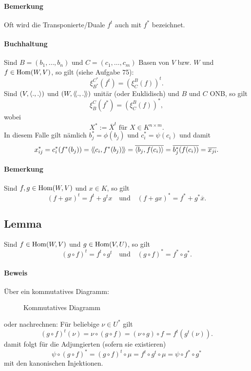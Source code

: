 \paragraph{Bemerkung}
	Oft wird die Transponierte/Duale $ f^t $ auch mit $ f^* $ bezeichnet.
\paragraph{Buchhaltung}
	Sind $ B=(b_1,\dots,b_n) $ und $ C=(c_1,\dots,c_m) $ Basen von $ V $ bzw. $ W $ und $ f\in \operatorname{Hom}(W,V) $, so gilt (siehe Aufgabe 75):
		\[ \xi_{B^*}^{C^*}(f^t) = \left(\xi_C^B(f)\right)^t. \]
	Sind $ (V,\langle .,. \rangle) $ und $ (W,\langle\! \langle .,. \rangle\! \rangle) $ unitär (oder Euklidisch) und $ B$ und $C $ ONB, so gilt
		\[ \xi_B^C(f^*) = \left(\xi_C^B(f)\right)^*, \]
	wobei 
		\[ X^*:= \overline{X}^t \text{ für } X\in K^{n\times m}. \]
	In diesem Falle gilt nämlich $ b_j^*=\phi(b_j) $ und $ c_i^* = \psi(c_i) $ und damit
		\[ x_{ij}^* = c_i^*(f^*(b_j)) = \langle\! \langle c_i,f^*(b_j) \rangle\! \rangle = \overline{\langle b_j,f(c_i) \rangle} =\overline{b_j^*(f(c_i))}= \overline{x_{ji}}. \]
\paragraph{Bemerkung}
	Sind $ f,g \in \operatorname{Hom}(W,V)$ und $ x\in K $, so gilt
		\[ (f+gx)^t = f^t+g^tx \quad\text{und}\quad (f+gx)^* = f^*+g^*\overline{x}. \]
		
\subsection{Lemma}
\begin{Lemma}
	Sind $ f\in \operatorname{Hom}(W,V) $ und $ g\in \operatorname{Hom}(V,U) $, so gilt
		\[ (g\circ f)^t = f^t \circ g^t \quad\text{und}\quad (g\circ f)^* = f^* \circ g^*. \]
\end{Lemma}
\paragraph{Beweis}
	Über ein kommutatives Diagramm:
     	\begin{figure}[ht]\centering
     		
     		\caption{Kommutatives Diagramm}
    	\end{figure}\noindent
	oder nachrechnen:
	Für beliebige $ \nu \in U^* $ gilt
		\[ (g\circ f)^t(\nu) = \nu \circ (g\circ f) = (\nu \circ g)\circ f = f^t(g^t(\nu)). \]	
	damit folgt für die Adjungierten (sofern sie existieren)
		\[ \psi \circ (g\circ f)^* = (g\circ f)^t \circ \mu = f^t\circ g^t \circ \mu = \psi \circ f^*\circ g^* \]
	mit den kanonischen Injektionen.

